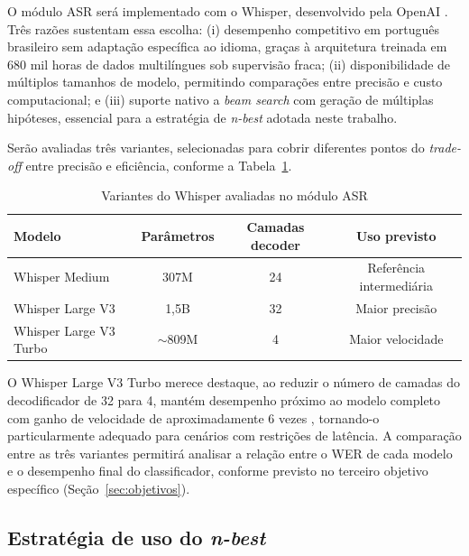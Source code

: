 \documentclass[
    12pt,                %
    openright,           %
    oneside,             %
    a4paper,             %
    english,             %
    brazil               %
]{abntex2}
\begin{document}
O módulo ASR será implementado com o Whisper, desenvolvido pela OpenAI \cite{Radford2023}. Três razões sustentam essa escolha: (i) desempenho competitivo em português brasileiro sem adaptação específica ao idioma, graças à arquitetura treinada em 680 mil horas de dados multilíngues sob supervisão fraca; (ii) disponibilidade de múltiplos tamanhos de modelo, permitindo comparações entre precisão e custo computacional; e (iii) suporte nativo a \textit{beam search} com geração de múltiplas hipóteses, essencial para a estratégia de \textit{n-best} adotada neste trabalho.

Serão avaliadas três variantes, selecionadas para cobrir diferentes pontos do \textit{trade-off} entre precisão e eficiência, conforme a Tabela~\ref{tab:whisper_modelos}.

\begin{table}[htb]
    \centering
    \caption{Variantes do Whisper avaliadas no módulo ASR}
    \label{tab:whisper_modelos}
    \begin{tabular}{lccc}
        \toprule
        \textbf{Modelo}
            & \textbf{Parâmetros}
            & \textbf{Camadas decoder}
            & \textbf{Uso previsto} \\
        \midrule
        Whisper Medium
            & 307M & 24 & Referência intermediária \\
        Whisper Large V3
            & 1,5B & 32 & Maior precisão \\
        Whisper Large V3 Turbo
            & $\sim$809M & 4  & Maior velocidade \\
        \bottomrule
    \end{tabular}
\end{table}

O Whisper Large V3 Turbo merece destaque, ao reduzir o número de camadas do decodificador de 32 para 4, mantém desempenho próximo ao modelo completo com ganho de velocidade de aproximadamente 6 vezes \cite{Jeffries2024, Bevilacqua2024}, tornando-o particularmente adequado para cenários com restrições de latência. A comparação entre as três variantes permitirá analisar a relação entre o WER de cada modelo e o desempenho final do classificador, conforme previsto no terceiro objetivo específico (Seção~\ref{sec:objetivos}).

\subsection{Estratégia de uso do \textit{n-best}}
\label{sec:nbest}
\end{document}
